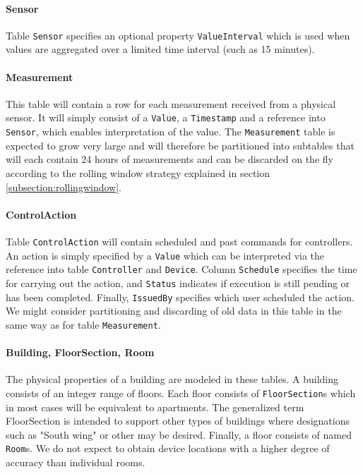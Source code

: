 \documentclass{report}
\begin{document}
\paragraph{Sensor} 
Table \texttt{Sensor} specifies an optional property \texttt{ValueInterval} which is used when values are aggregated over a limited time interval (such as 15 minutes). 

\paragraph{Measurement} 
This table will contain a row for each measurement received from a physical sensor. It will simply consist of a \texttt{Value}, a \texttt{Timestamp} and a reference into \texttt{Sensor}, which enables interpretation of the value. The \texttt{Measurement} table is expected to grow very large and will therefore be partitioned into subtables that will each contain 24 hours of measurements and can be discarded on the fly according to the rolling window strategy explained in section \ref{subsection:rollingwindow}.

\paragraph{ControlAction} 
Table \texttt{ControlAction} will contain scheduled and past commands for controllers. An action is simply specified by a \texttt{Value} which can be interpreted via the reference into table \texttt{Controller} and \texttt{Device}. Column \texttt{Schedule} specifies the time for carrying out the action, and \texttt{Status} indicates if execution is still pending or has been completed. Finally, \texttt{IssuedBy} specifies which user scheduled the action. We might consider partitioning and discarding of old data in this table in the same way as for table \texttt{Measurement}.

\paragraph{Building, FloorSection, Room}
The physical properties of a building are modeled in these tables. A building consists of an integer range of floors. Each floor consists of \texttt{FloorSection}s which in most cases will be equivalent to apartments. The generalized term FloorSection is intended to support other types of buildings where designations such as "South wing" or other may be desired. Finally, a floor consists of named \texttt{Room}s. We do not expect to obtain device locations with a higher degree of accuracy than individual rooms.
\end{document}
